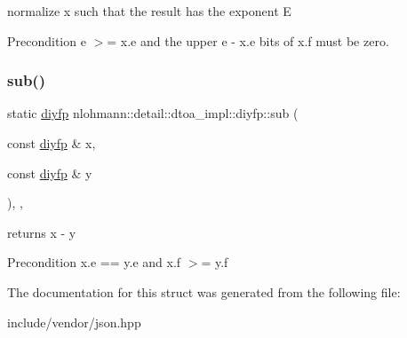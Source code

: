 normalize x such that the result has the exponent E 

\begin{DoxyPrecond}{Precondition}
e $>$= x.\+e and the upper e -\/ x.\+e bits of x.\+f must be zero. 
\end{DoxyPrecond}
\mbox{\label{structnlohmann_1_1detail_1_1dtoa__impl_1_1diyfp_aeb26771af54ad73598c1a0430d65d884}} 
\subsubsection{\texorpdfstring{sub()}{sub()}}
{\footnotesize\ttfamily static \mbox{\hyperlink{structnlohmann_1_1detail_1_1dtoa__impl_1_1diyfp}{diyfp}} nlohmann\+::detail\+::dtoa\+\_\+impl\+::diyfp\+::sub (\begin{DoxyParamCaption}\item[{const \mbox{\hyperlink{structnlohmann_1_1detail_1_1dtoa__impl_1_1diyfp}{diyfp}} \&}]{x,  }\item[{const \mbox{\hyperlink{structnlohmann_1_1detail_1_1dtoa__impl_1_1diyfp}{diyfp}} \&}]{y }\end{DoxyParamCaption})\hspace{0.3cm}{\ttfamily [inline]}, {\ttfamily [static]}, {\ttfamily [noexcept]}}



returns x -\/ y 

\begin{DoxyPrecond}{Precondition}
x.\+e == y.\+e and x.\+f $>$= y.\+f 
\end{DoxyPrecond}


The documentation for this struct was generated from the following file\+:\begin{DoxyCompactItemize}
\item 
include/vendor/json.\+hpp\end{DoxyCompactItemize}
